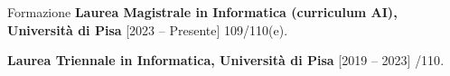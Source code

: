 \begin{rubric}{Formazione}
\entry*%
	\textbf{Laurea Magistrale in Informatica (curriculum AI), Universit\`a di Pisa} [2023 -- Presente] {\mbox{}\hfill 109/110(e)}.\par
% 
\entry*%
	\textbf{Laurea Triennale in Informatica, Universit\`a di Pisa} [2019 -- 2023] {\mbox{}\hfill {}/110}.
\end{rubric}
